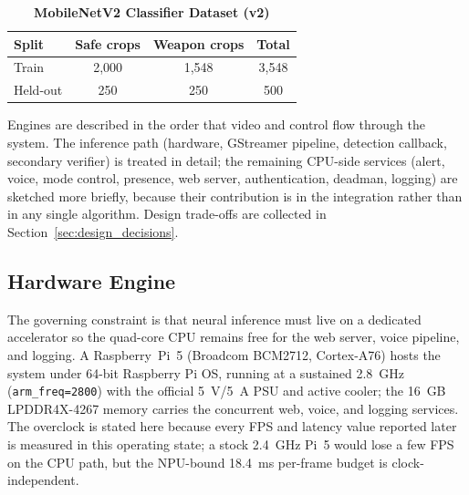 \documentclass{ieeeaccess}
\begin{document}
\begin{table}[ht!]
\caption{\textbf{MobileNetV2 Classifier Dataset (v2)}}
\label{tab:mobilenet}
\setlength{\tabcolsep}{4pt}
\centering\small
\begin{tabular}{|l|c|c|c|}
\hline
\textbf{Split} & \textbf{Safe crops} & \textbf{Weapon crops} & \textbf{Total} \\
\hline
Train    & 2{,}000 & 1{,}548 & 3{,}548 \\
Held-out & 250     & 250     & 500 \\
\hline
\end{tabular}
\end{table}


Engines are described in the order that video and control flow through the system. The inference path (hardware, GStreamer pipeline, detection callback, secondary verifier) is treated in detail; the remaining CPU-side services (alert, voice, mode control, presence, web server, authentication, deadman, logging) are sketched more briefly, because their contribution is in the integration rather than in any single algorithm. Design trade-offs are collected in Section~\ref{sec:design_decisions}.

\subsection{Hardware Engine}
The governing constraint is that neural inference must live on a dedicated accelerator so the quad-core CPU remains free for the web server, voice pipeline, and logging. A Raspberry~Pi~5 (Broadcom BCM2712, Cortex-A76) hosts the system under 64-bit Raspberry Pi OS, running at a sustained 2.8~GHz (\texttt{arm\_freq=2800}) with the official 5~V/5~A PSU and active cooler; the 16~GB LPDDR4X-4267 memory carries the concurrent web, voice, and logging services. The overclock is stated here because every FPS and latency value reported later is measured in this operating state; a stock 2.4~GHz Pi~5 would lose a few FPS on the CPU path, but the NPU-bound 18.4~ms per-frame budget is clock-independent.
\end{document}
